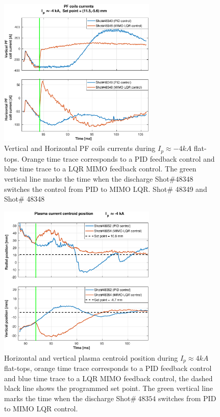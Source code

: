 \begin{figure}
	\centering
	\includegraphics[width=0.67\textwidth]{Chp5/PIDvsMIMO_349_348_curr_2.eps}
	\caption{ Vertical and Horizontal PF coils currents during  $I_p\approx -4kA$  flat-tops. Orange time trace corresponds to a PID feedback control and blue time trace to a LQR MIMO feedback control. The green vertical line marks the time  when the  discharge Shot$\# 48348$ switches the control from PID to MIMO LQR. Shot$\#$ 48349 and Shot$\#$ 48348}
\end{figure}


\begin{figure}
	\centering
	\includegraphics[width=0.67\textwidth]{Chp5/PIDvsMIMO_352_354_2.eps}
	\caption{Horizontal and vertical plasma centroid position during  $I_p\approx 4kA$  flat-tops, orange time trace corresponds to a PID feedback control and blue time trace to a LQR MIMO feedback control, the dashed black line shows the programmed set point. The green vertical line marks the time  when the  discharge Shot$\# ~48354$ switches  from PID to MIMO LQR control.}
\end{figure}

